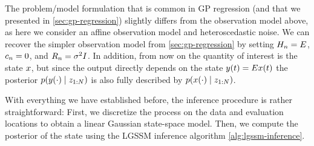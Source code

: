 \documentclass{mimosis}
\begin{document}
\begin{remark}
The problem/model formulation that is common in GP regression (and that we presented in \cref{sec:gp-regression}) slightly differs from the observation model above, as here we consider an affine observation model and heteroscedastic noise.
We can recover the simpler observation model from \cref{sec:gp-regression}
by setting \(H_n = E\), \(c_n = 0\), and \(R_n = \sigma^2 I\).
In addition, from now on the quantity of interest is the state \(x\),
but since the output directly depends on the state \(y(t) = E x(t)\) the posterior \(\p(\val(\cdot) \mid \sobs_{1:N})\) is also fully described by \(\p(\st(\cdot) \mid \sobs_{1:N})\).
\end{remark}

With everything we have established before, the inference procedure is rather straightforward:
First, we discretize the process on the data and evaluation locations to obtain a linear Gaussian state-space model. Then, we compute the posterior of the state using the LGSSM inference algorithm \ref{alg:lgssm-inference}.
\end{document}
